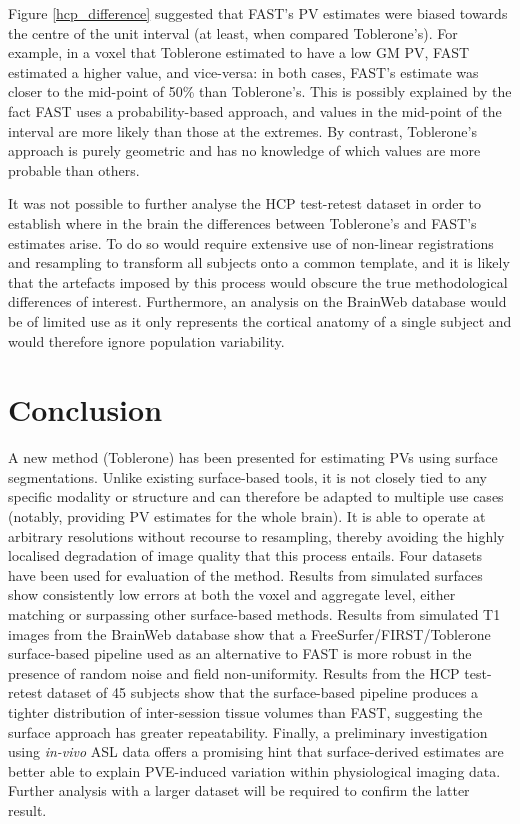 Figure \ref{hcp_difference} suggested that FAST's PV estimates were biased towards the centre of the unit interval (at least, when compared Toblerone's). For example, in a voxel that Toblerone estimated to have a low GM PV, FAST estimated a higher value, and vice-versa: in both cases, FAST's estimate was closer to the mid-point of 50\% than Toblerone's. This is possibly explained by the fact FAST uses a probability-based approach, and values in the mid-point of the interval are more likely than those at the extremes. By contrast, Toblerone's approach is purely geometric and has no knowledge of which values are more probable than others. 

It was not possible to further analyse the HCP test-retest dataset in order to establish where in the brain the differences between Toblerone’s and FAST’s estimates arise. To do so would require extensive use of non-linear registrations and resampling to transform all subjects onto a common template, and it is likely that the artefacts imposed by this process would obscure the true methodological differences of interest. Furthermore, an analysis on the BrainWeb database would be of limited use as it only represents the cortical anatomy of a single subject and would therefore ignore population variability.

\section{Conclusion}

A new method (Toblerone) has been presented for estimating PVs using surface segmentations. Unlike existing surface-based tools, it is not closely tied to any specific modality or structure and can therefore be adapted to multiple use cases (notably, providing PV estimates for the whole brain). It is able to operate at arbitrary resolutions without recourse to resampling, thereby avoiding the highly localised degradation of image quality that this process entails. Four datasets have been used for evaluation of the method. Results from simulated surfaces show consistently low errors at both the voxel and aggregate level, either matching or surpassing other surface-based methods. Results from simulated T1 images from the BrainWeb database show that a FreeSurfer/FIRST/Toblerone surface-based pipeline used as an alternative to FAST is more robust in the presence of random noise and field non-uniformity. Results from the HCP test-retest dataset of 45 subjects show that the surface-based pipeline produces a tighter distribution of inter-session tissue volumes than FAST, suggesting the surface approach has greater repeatability. Finally, a preliminary investigation using \textit{in-vivo} ASL data offers a promising hint that surface-derived estimates are better able to explain PVE-induced variation within physiological imaging data. Further analysis with a larger dataset will be required to confirm the latter result. 
